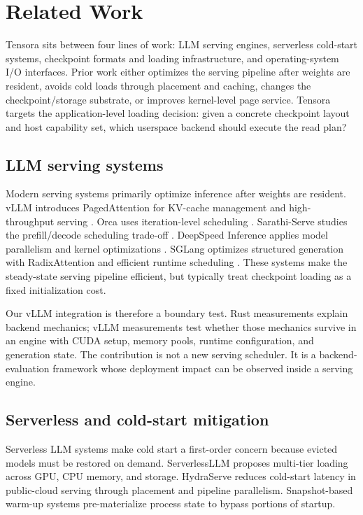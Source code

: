 \section{Related Work}
\label{sec:related_work}

Tensora sits between four lines of work: LLM serving engines, serverless cold-start systems, checkpoint formats and loading infrastructure, and operating-system I/O interfaces. Prior work either optimizes the serving pipeline after weights are resident, avoids cold loads through placement and caching, changes the checkpoint/storage substrate, or improves kernel-level page service. Tensora targets the application-level loading decision: given a concrete checkpoint layout and host capability set, which userspace backend should execute the read plan?

\subsection{LLM serving systems}

Modern serving systems primarily optimize inference after weights are resident. vLLM introduces PagedAttention for KV-cache management and high-throughput serving \cite{pagedattention}. Orca uses iteration-level scheduling \cite{orca}. Sarathi-Serve studies the prefill/decode scheduling trade-off \cite{sarathi_serve}. DeepSpeed Inference applies model parallelism and kernel optimizations \cite{deepspeed_inference_paper}. SGLang optimizes structured generation with RadixAttention and efficient runtime scheduling \cite{sglang2024}. These systems make the steady-state serving pipeline efficient, but typically treat checkpoint loading as a fixed initialization cost.

Our vLLM integration is therefore a boundary test. Rust measurements explain backend mechanics; vLLM measurements test whether those mechanics survive in an engine with CUDA setup, memory pools, runtime configuration, and generation state. The contribution is not a new serving scheduler. It is a backend-evaluation framework whose deployment impact can be observed inside a serving engine.

\subsection{Serverless and cold-start mitigation}

Serverless LLM systems make cold start a first-order concern because evicted models must be restored on demand. ServerlessLLM \cite{FU:2024} proposes multi-tier loading across GPU, CPU memory, and storage. HydraServe \cite{hydraserve} reduces cold-start latency in public-cloud serving through placement and pipeline parallelism. Snapshot-based warm-up systems \cite{silva2021snapshot} pre-materialize process state to bypass portions of startup.

